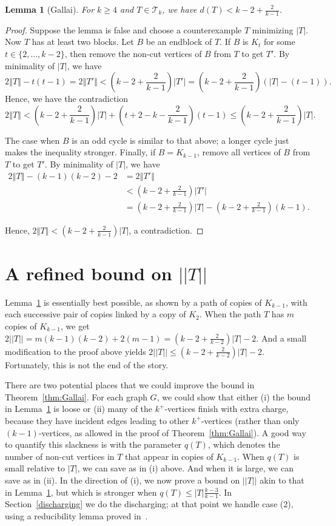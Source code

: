 \documentclass[12pt]{article}
\theoremstyle{plain}
\newtheorem{lem}[thm]{Lemma}
\theoremstyle{definition}
\theoremstyle{remark}
\newcommand{\fancy}[1]{\mathcal{#1}}
\newcommand{\T}{\fancy{T}}
\newcommand{\size}[1]{\left\Vert#1\right\Vert}
\newcommand{\parens}[1]{\left( #1 \right)}
\begin{document}
\begin{lem}[Gallai]
\label{BasicGallaiTreeBound}
	For $k \ge 4$ and $T \in \T_k$, we have $d(T) < k-2 + \frac{2}{k-1}$.
\end{lem}
\begin{proof}
	Suppose the lemma is false and choose a counterexample $T$ minimizing $|T|$.  Now $T$ has at least two blocks.  Let $B$ be an endblock of $T$.  If $B$ is $K_t$ for some $t\in \{2,\ldots, k-2\}$, then remove the non-cut vertices of $B$ from $T$ to get $T'$.  By minimality of $|T|$, we have 
	\[2\size{T} - t(t-1) = 2\size{T'} < \parens{k-2 + \frac{2}{k-1}}|T'| = \parens{k-2 + \frac{2}{k-1}}\parens{|T|-(t-1)}.\]
	Hence, we have the contradiction
	\[2\size{T} < \parens{k-2 + \frac{2}{k-1}}|T| + (t+2 -k - \frac{2}{k-1})(t-1) \le \parens{k-2 + \frac{2}{k-1}}|T|.\]
	
	The case when $B$ is an odd cycle is similar to that above; a longer cycle just makes the inequality stronger.  Finally, if $B = K_{k-1}$, remove all vertices of $B$ from $T$ to get $T'$. By minimality of $|T|$, we have 
	\begin{align*}
	  2\size{T} - (k-1)(k-2) - 2 &= 2\size{T'}\\
	  &< \parens{k-2 + \frac{2}{k-1}}|T'|\\
	  &= \parens{k-2 + \frac{2}{k-1}}|T| - \parens{k-2 + \frac{2}{k-1}}(k-1).
	\end{align*}

	Hence, $2\size{T} < \parens{k-2 + \frac{2}{k-1}}|T|$, a contradiction.
\end{proof}

\section{A refined bound on $||T||$}
Lemma~\ref{BasicGallaiTreeBound} is essentially best possible, as shown by a
path of copies of $K_{k-1}$, with each successive pair of copies linked by a
copy of $K_2$.  When the path $T$ has $m$ copies of $K_{k-1}$, we get
$2||T||=m(k-1)(k-2)+2(m-1) = (k-2+\frac2{k-2})|T|-2$.  And a small modification
to the proof above yields $2||T|| \le (k-2+\frac2{k-2})|T|-2$. 
Fortunately, this is not the end of the story.

There are two potential places that we could improve the bound in
Theorem~\ref{thm:Gallai}. For each graph $G$, we could show that either (i) the
bound in Lemma~\ref{BasicGallaiTreeBound} is loose or (ii) many of the
$k^+$-vertices finish with extra charge, because they have incident edges
leading to other $k^+$-vertices (rather than only $(k-1)$-vertices, as allowed
in the proof of Theorem~\ref{thm:Gallai}).  A good way to quantify this
slackness is with the parameter $q(T)$, which denotes the number of non-cut
vertices in $T$ that appear in copies of $K_{k-1}$.  When $q(T)$ is small
relative to $|T|$, we can save as in (i) above.  And when it is large, we can save
as in (ii).  In the direction of (i), we now prove a bound on $||T||$ akin to
that in Lemma~\ref{BasicGallaiTreeBound}, but which is stronger when
$q(T)\le|T|\frac{k-3}{k-1}$.  In Section~\ref{discharging} 
we do the discharging; at that point we handle case (2),
using a reducibility lemma proved in~\cite{OreVizing}. 
\end{document}
